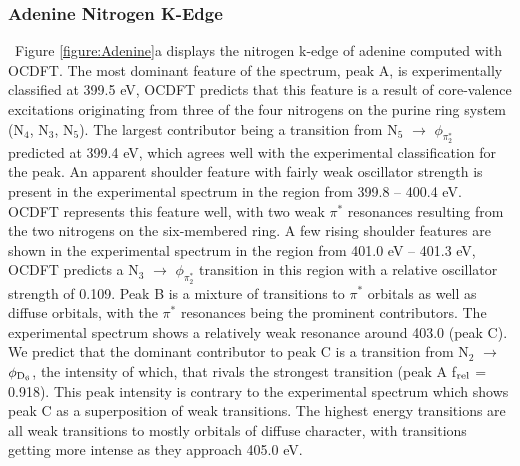 \documentclass[12pt]{article}
\begin{document}
\subsubsection{Adenine Nitrogen K-Edge}
   \ Figure \ref{figure:Adenine}a displays the nitrogen k-edge of adenine computed with OCDFT. The most dominant feature of the spectrum, peak A, is experimentally classified at 399.5 eV, OCDFT predicts that this feature is a result of core-valence excitations originating from three of the four nitrogens on the purine ring system (N$_4$, N$_3$, N$_5$). The largest contributor being a transition from N$_5$ $\rightarrow$ $\phi_{\pi_2^*}$ predicted at 399.4 eV, which agrees well with the experimental classification for the peak. An apparent shoulder feature with fairly weak oscillator strength is present in the experimental spectrum in the region from 399.8 -- 400.4 eV. OCDFT represents this feature well, with two weak $\pi^*$ resonances resulting from the two nitrogens on the six-membered ring. A few rising shoulder features are shown in the experimental spectrum in the region from 401.0 eV -- 401.3 eV, OCDFT predicts a N$_3$ $\rightarrow$ $\phi_{\pi_2^*}$ transition in this region with a relative oscillator strength of 0.109. Peak B is a mixture of transitions to $\pi^*$ orbitals as well as diffuse orbitals, with the $\pi^*$ resonances being the prominent contributors. 
The experimental spectrum shows a relatively weak resonance around 403.0 (peak C).  We predict that the dominant contributor to peak C is a transition from N$_2$ $\rightarrow$ $\phi_{\rm D_6}$, the intensity of which, that rivals the strongest transition (peak A f$_{\rm rel}$ = 0.918). This peak intensity is contrary to the experimental spectrum which shows peak C  as a superposition of weak transitions. The highest energy transitions are all weak transitions to mostly orbitals of diffuse character, with transitions getting more intense as they approach 405.0 eV. 
\end{document}
